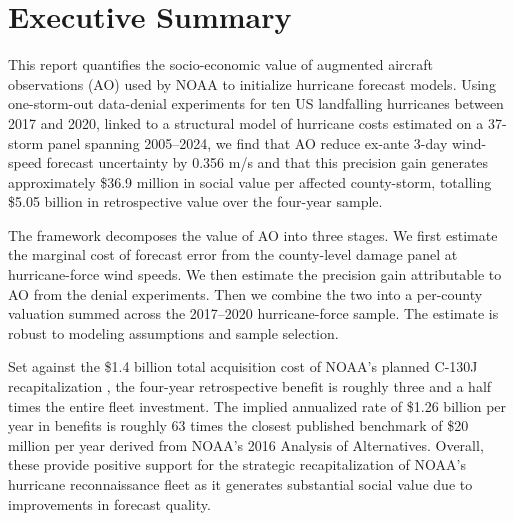 \documentclass[12pt]{article}%
\begin{document}
\newpage
\section*{Executive Summary}

This report quantifies the socio-economic value of augmented aircraft observations (AO) used by NOAA to initialize hurricane forecast models. Using one-storm-out data-denial experiments for ten US landfalling hurricanes between 2017 and 2020, linked to a structural model of hurricane costs estimated on a 37-storm panel spanning 2005--2024, we find that AO reduce ex-ante 3-day wind-speed forecast uncertainty by 0.356 m/s and that this precision gain generates approximately \$36.9 million in social value per affected county-storm, totalling \$5.05 billion in retrospective value over the four-year sample.

The framework decomposes the value of AO into three stages. We first estimate the marginal cost of forecast error from the county-level damage panel at hurricane-force wind speeds. We then estimate the precision gain attributable to AO from the denial experiments. Then we combine the two into a per-county valuation summed across the 2017--2020 hurricane-force sample. The estimate is robust to modeling assumptions and sample selection.

Set against the \$1.4 billion total acquisition cost of NOAA's planned C-130J recapitalization \citep{GAO2025HurricaneHunter}, the four-year retrospective benefit is roughly three and a half times the entire fleet investment. The implied annualized rate of \$1.26 billion per year in benefits is roughly 63 times the closest published benchmark of \$20 million per year derived from NOAA's 2016 Analysis of Alternatives. Overall, these provide positive support for the strategic recapitalization of NOAA's hurricane reconnaissance fleet as it generates substantial social value due to improvements in forecast quality.

\clearpage 

 \begin{singlespace}
 	\tableofcontents
 	\listoftables
 	\listoffigures
 \end{singlespace}
 \newpage
\end{document}
